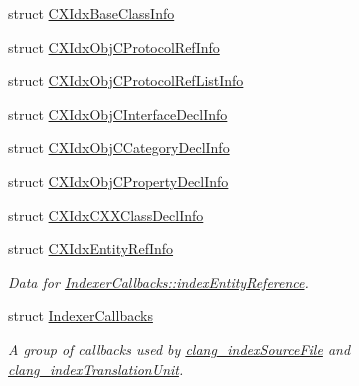 \begin{DoxyCompactItemize}
\item 
struct \hyperlink{structCXIdxBaseClassInfo}{C\+X\+Idx\+Base\+Class\+Info}
\item 
struct \hyperlink{structCXIdxObjCProtocolRefInfo}{C\+X\+Idx\+Obj\+C\+Protocol\+Ref\+Info}
\item 
struct \hyperlink{structCXIdxObjCProtocolRefListInfo}{C\+X\+Idx\+Obj\+C\+Protocol\+Ref\+List\+Info}
\item 
struct \hyperlink{structCXIdxObjCInterfaceDeclInfo}{C\+X\+Idx\+Obj\+C\+Interface\+Decl\+Info}
\item 
struct \hyperlink{structCXIdxObjCCategoryDeclInfo}{C\+X\+Idx\+Obj\+C\+Category\+Decl\+Info}
\item 
struct \hyperlink{structCXIdxObjCPropertyDeclInfo}{C\+X\+Idx\+Obj\+C\+Property\+Decl\+Info}
\item 
struct \hyperlink{structCXIdxCXXClassDeclInfo}{C\+X\+Idx\+C\+X\+X\+Class\+Decl\+Info}
\item 
struct \hyperlink{structCXIdxEntityRefInfo}{C\+X\+Idx\+Entity\+Ref\+Info}
\begin{DoxyCompactList}\small\item\em Data for \hyperlink{structIndexerCallbacks_a6d93809e7743a590beafa0387ac145dc}{Indexer\+Callbacks\+::index\+Entity\+Reference}. \end{DoxyCompactList}\item 
struct \hyperlink{structIndexerCallbacks}{Indexer\+Callbacks}
\begin{DoxyCompactList}\small\item\em A group of callbacks used by \hyperlink{group__CINDEX__HIGH_gaa5c2ad8979779c401b91110d444e2be6}{clang\+\_\+index\+Source\+File} and \hyperlink{group__CINDEX__HIGH_gab12a0795c7d7be6e7ec85679faf3f8e9}{clang\+\_\+index\+Translation\+Unit}. \end{DoxyCompactList}\end{DoxyCompactItemize}
